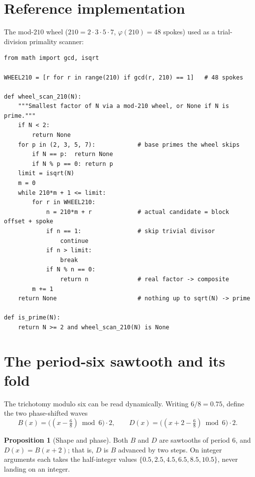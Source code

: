 \documentclass[11pt]{article}
\theoremstyle{definition}
\newtheorem{proposition}{Proposition}
\begin{document}
\section{Reference implementation}

The mod-$210$ wheel ($210 = 2\cdot3\cdot5\cdot7$, $\varphi(210)=48$ spokes)
used as a trial-division primality scanner:

\begin{lstlisting}
from math import gcd, isqrt

WHEEL210 = [r for r in range(210) if gcd(r, 210) == 1]   # 48 spokes

def wheel_scan_210(N):
    """Smallest factor of N via a mod-210 wheel, or None if N is prime."""
    if N < 2:
        return None
    for p in (2, 3, 5, 7):            # base primes the wheel skips
        if N == p:  return None
        if N % p == 0: return p
    limit = isqrt(N)
    m = 0
    while 210*m + 1 <= limit:
        for r in WHEEL210:
            n = 210*m + r             # actual candidate = block offset + spoke
            if n == 1:                # skip trivial divisor
                continue
            if n > limit:
                break
            if N % n == 0:
                return n              # real factor -> composite
        m += 1
    return None                       # nothing up to sqrt(N) -> prime

def is_prime(N):
    return N >= 2 and wheel_scan_210(N) is None
\end{lstlisting}

\section{The period-six sawtooth and its fold}

The trichotomy modulo six can be read dynamically. Writing $6/8=0.75$, define
the two phase-shifted waves
\[
  B(x) = \bigl((x - \tfrac{6}{8}) \bmod 6\bigr)\cdot 2,
  \qquad
  D(x) = \bigl((x + 2 - \tfrac{6}{8}) \bmod 6\bigr)\cdot 2 .
\]

\begin{proposition}[Shape and phase]
Both $B$ and $D$ are sawtooths of period $6$, and $D(x)=B(x+2)$; that is, $D$ is
$B$ advanced by two steps. On integer arguments each takes the half-integer
values $\{0.5,2.5,4.5,6.5,8.5,10.5\}$, never landing on an integer.
\end{proposition}
\end{document}
